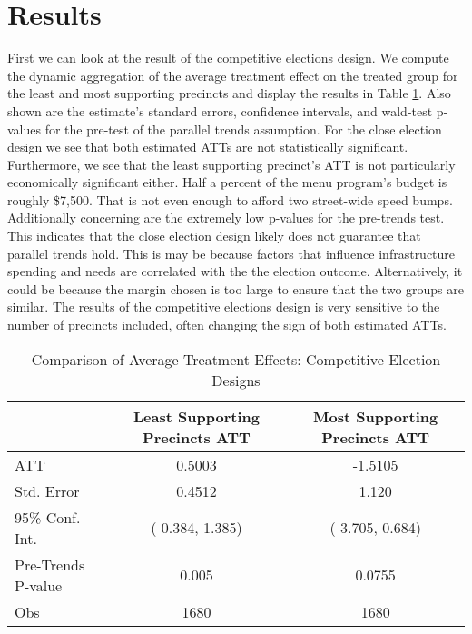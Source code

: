 \section{Results}

First we can look at the result of the competitive elections design.
We compute the dynamic aggregation of the average treatment effect on the treated group for the least and most supporting precincts and display the results in Table \ref{tab:att_comparison_close_election}.
Also shown are the estimate's standard errors, confidence intervals, and wald-test p-values for the pre-test of the parallel trends assumption.
For the close election design we see that both estimated ATTs are not statistically significant.
Furthermore, we see that the least supporting precinct's ATT is not particularly economically significant either. 
Half a percent of the menu program's budget is roughly \$7,500. 
That is not even enough to afford two street-wide speed bumps.
Additionally concerning are the extremely low p-values for the pre-trends test.
This indicates that the close election design likely does not guarantee that parallel trends hold.
This is may be because factors that influence infrastructure spending and needs are correlated with the the election outcome.
Alternatively, it could be because the margin chosen is too large to ensure that the two groups are similar.
The results of the competitive elections design is very sensitive to the number of precincts included, often changing the sign of both estimated ATTs.
\begin{table}[ht]
    \centering
    \caption{Comparison of Average Treatment Effects: Competitive Election Designs}
    \label{tab:att_comparison_close_election}
    \begin{tabular}{lcc}
    \hline
     & Least Supporting Precincts ATT & Most Supporting Precincts ATT \\
    \hline
    ATT & 0.5003 &  -1.5105 \\
    Std. Error & 0.4512 &  1.120 \\
    95\% Conf. Int. & (-0.384, 1.385) & (-3.705, 0.684) \\
    Pre-Trends P-value & 0.005  & 0.0755 \\
    Obs & 1680 & 1680 \\
    \hline
    \end{tabular}
\end{table}

